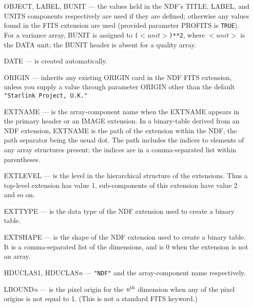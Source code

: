 \documentclass[twoside,11pt]{article}
\newcommand{\sstitem}{\item}
\newcommand{\sstitem}{\item}
\begin{document}
{{{{            \sstitem
            OBJECT, LABEL, BUNIT --- the values held in the NDF's TITLE,
              LABEL, and UNITS components respectively are used if
              they are defined; otherwise any values found in the FITS
              extension are used (provided parameter PROFITS is \texttt{TRUE}).
              For a variance array, BUNIT is assigned to 
              \texttt{($<unit>$)**2}, where $<unit>$ is the DATA unit; the
              BUNIT header is absent for a quality array.

            \sstitem
            DATE --- is created automatically.

            \sstitem
            ORIGIN --- inherits any existing ORIGIN card in the NDF FITS
              extension, unless you supply a value through parameter
              ORIGIN other than the default \texttt{"Starlink Project, U.K."}

            \sstitem
            EXTNAME --- is the array-component name when the EXTNAME
              appears in the primary header or an IMAGE extension.  In a
              binary-table derived from an NDF extension, EXTNAME is the
              path of the extension within the NDF, the path separator
              being the usual dot.  The path includes the indices to
              elements of any array structures present; the indices are in
              a comma-separated list within parentheses.

            \sstitem
            EXTLEVEL --- is the level in the hierarchical structure of the
              extensions.  Thus a top-level extension has value 1,
              sub-components of this extension have value 2 and so on.

            \sstitem
            EXTTYPE --- is the data type of the NDF extension used to
              create a binary table.

            \sstitem
            EXTSHAPE --- is the shape of the NDF extension used to
            create a binary table.  It is a comma-separated list of the
            dimensions, and is 0 when the extension is not an array.

            \sstitem
            HDUCLAS1, HDUCLAS{\em{n}} --- \texttt{"NDF"} and the
              array-component name respectively.

            \sstitem
            LBOUND{\textit{n}} --- is the pixel origin for the 
              $\textit{n}^{\rm th}$ dimension
              when any of the pixel origins is not equal to 1.  (This is not a
              standard FITS keyword.)

}}}}
\end{document}

